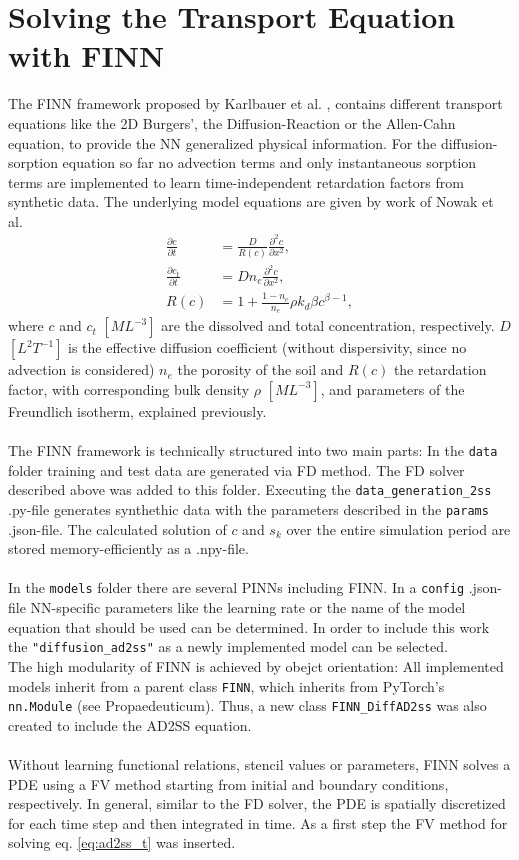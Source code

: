 \section{Solving the Transport Equation with FINN}
The FINN framework proposed by Karlbauer et al. \cite{karlbauer2021composing}, contains different transport equations like the 2D Burgers', the Diffusion-Reaction or the Allen-Cahn equation, to provide the NN generalized physical information. For the diffusion-sorption equation so far no advection terms and only instantaneous sorption terms are implemented to learn time-independent retardation factors from synthetic data. The underlying model equations are given by work of Nowak et al. \cite{Nowak2016Nov}
\begin{align}
    \frac{\partial c}{\partial t} &= \frac{D}{R(c)} \frac{\partial^2 c}{\partial x^2},\\
    \frac{\partial c_t}{\partial t} &= Dn_e\frac{\partial^2c}{\partial x^2},\\
    R(c) &= 1 + \frac{1-n_e}{n_e}\rho k_d\beta c^{\beta-1},
    \label{eq:finn_sofar}
\end{align}
where $c$ and $c_t$ $[M L^{-3}]$ are the dissolved and total concentration, respectively. $D$ $[L^2 T^{-1}]$ is the effective diffusion coefficient (without dispersivity, since no advection is considered) $n_e$ the porosity of the soil and $R(c)$ the retardation factor, with corresponding bulk density $\rho$ $[M L^{-3}]$, and parameters of the Freundlich isotherm, explained previously.\\
\\
The FINN framework is technically structured into two main parts: In the \texttt{data} folder training and test data are generated via FD method. The FD solver described above was added to this folder. Executing the \texttt{data\_generation\_2ss} .py-file generates synthethic data with the parameters described in the \texttt{params} .json-file. The calculated solution of $c$ and $s_k$ over the entire simulation period are stored memory-efficiently as a .npy-file.\\
\\
In the \texttt{models} folder there are several PINNs including FINN. In a \texttt{config} .json-file NN-specific parameters like the learning rate or the name of the model equation that should be used can be determined. In order to include this work the \texttt{"diffusion\_ad2ss"} as a newly implemented model can be selected.\\
The high modularity of FINN is achieved by obejct orientation: All implemented models inherit from a parent class \texttt{FINN}, which inherits from PyTorch's \texttt{nn.Module} (see Propaedeuticum). Thus, a new class \texttt{FINN\_DiffAD2ss} was also created to include the AD2SS equation.\\
\\
Without learning functional relations, stencil values or parameters, FINN solves a PDE using a FV method starting from initial and boundary conditions, respectively. In general, similar to the FD solver, the PDE is spatially discretized for each time step and then integrated in time. As a first step the FV method for solving eq. \ref{eq:ad2ss_t} was inserted.
